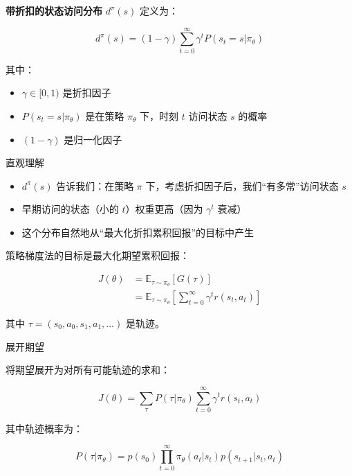 \documentclass[lang=cn,newtx,10pt,scheme=chinese]{elegantbook}
\begin{document}
\textbf{带折扣的状态访问分布} $d^\pi(s)$ 定义为：

\begin{equation}
d^\pi(s) = (1-\gamma) \sum_{t=0}^{\infty} \gamma^t P(s_t = s | \pi_\theta)
\end{equation}

其中：

\begin{itemize}
\item $\gamma \in [0,1)$ 是折扣因子
\item $P(s_t = s | \pi_\theta)$ 是在策略 $\pi_\theta$ 下，时刻 $t$ 访问状态 $s$ 的概率
\item $(1-\gamma)$ 是归一化因子
\end{itemize}

直观理解

\begin{itemize}
\item $d^\pi(s)$ 告诉我们：在策略 $\pi$ 下，考虑折扣因子后，我们``有多常''访问状态 $s$
\item 早期访问的状态（小的 $t$）权重更高（因为 $\gamma^t$ 衰减）
\item 这个分布自然地从``最大化折扣累积回报''的目标中产生
\end{itemize}

策略梯度法的目标是最大化期望累积回报：

\begin{equation}
\begin{aligned}
J(\theta) &= \mathbb{E}_{\tau \sim \pi_\theta}\left[ G(\tau) \right] \\
&= \mathbb{E}_{\tau \sim \pi_\theta} \left[ \sum_{t=0}^{\infty} \gamma^t r(s_t, a_t) \right]
\end{aligned}
\end{equation}

其中 $\tau = (s_0, a_0, s_1, a_1, \ldots)$ 是轨迹。

展开期望

将期望展开为对所有可能轨迹的求和：

\begin{equation}
J(\theta) = \sum_{\tau} P(\tau | \pi_\theta) \sum_{t=0}^{\infty} \gamma^t r(s_t, a_t)
\end{equation}

其中轨迹概率为：

\begin{equation}
P(\tau | \pi_\theta) = p(s_0) \prod_{t=0}^{\infty} \pi_\theta(a_t|s_t) p(s_{t+1}|s_t, a_t)
\end{equation}
\end{document}
